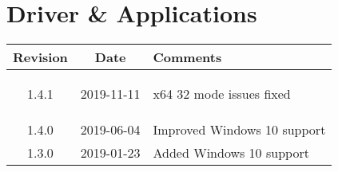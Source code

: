 \section{Driver \& Applications}
\begin{tabularx}{\textwidth}{|c|c|X|}
    \hline
    Revision & Date & Comments\\
    \hline\hline
    \hypertarget{drvrev}{1.4.1} & 2019-11-11 & x64 32 mode issues fixed\\
    \hline
    {1.4.0} & 2019-06-04 & Improved Windows 10 support\\
    \hline
    {1.3.0} & 2019-01-23 & Added Windows 10 support\\
    \hline
\end{tabularx}